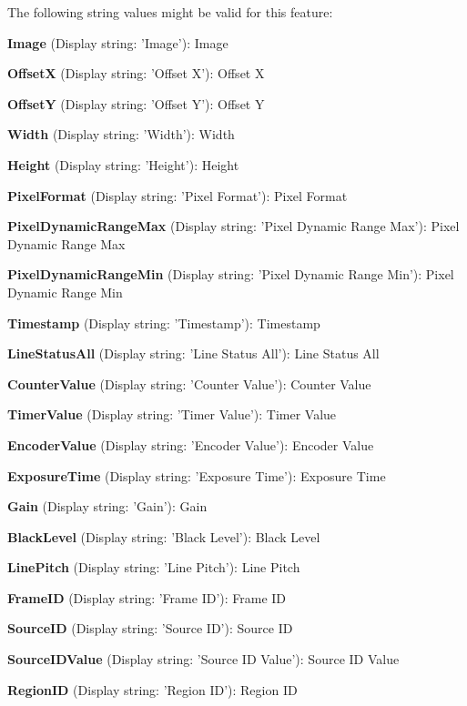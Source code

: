 The following string values might be valid for this feature\+:
\begin{DoxyItemize}
\item {\bfseries Image} (Display string\+: 'Image')\+: Image
\item {\bfseries Offset\+X} (Display string\+: 'Offset X')\+: Offset X
\item {\bfseries Offset\+Y} (Display string\+: 'Offset Y')\+: Offset Y
\item {\bfseries Width} (Display string\+: 'Width')\+: Width
\item {\bfseries Height} (Display string\+: 'Height')\+: Height
\item {\bfseries Pixel\+Format} (Display string\+: 'Pixel Format')\+: Pixel Format
\item {\bfseries Pixel\+Dynamic\+Range\+Max} (Display string\+: 'Pixel Dynamic Range Max')\+: Pixel Dynamic Range Max
\item {\bfseries Pixel\+Dynamic\+Range\+Min} (Display string\+: 'Pixel Dynamic Range Min')\+: Pixel Dynamic Range Min
\item {\bfseries Timestamp} (Display string\+: 'Timestamp')\+: Timestamp
\item {\bfseries Line\+Status\+All} (Display string\+: 'Line Status All')\+: Line Status All
\item {\bfseries Counter\+Value} (Display string\+: 'Counter Value')\+: Counter Value
\item {\bfseries Timer\+Value} (Display string\+: 'Timer Value')\+: Timer Value
\item {\bfseries Encoder\+Value} (Display string\+: 'Encoder Value')\+: Encoder Value
\item {\bfseries Exposure\+Time} (Display string\+: 'Exposure Time')\+: Exposure Time
\item {\bfseries Gain} (Display string\+: 'Gain')\+: Gain
\item {\bfseries Black\+Level} (Display string\+: 'Black Level')\+: Black Level
\item {\bfseries Line\+Pitch} (Display string\+: 'Line Pitch')\+: Line Pitch
\item {\bfseries Frame\+I\+D} (Display string\+: 'Frame I\+D')\+: Frame I\+D
\item {\bfseries Source\+I\+D} (Display string\+: 'Source I\+D')\+: Source I\+D
\item {\bfseries Source\+I\+D\+Value} (Display string\+: 'Source I\+D Value')\+: Source I\+D Value
\item {\bfseries Region\+I\+D} (Display string\+: 'Region I\+D')\+: Region I\+D

\end{DoxyItemize}
